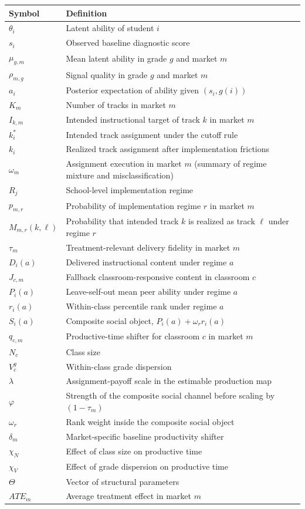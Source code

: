 \documentclass[11pt]{article}
\begin{document}
\begin{longtable}{p{2.5cm}p{11cm}}
\toprule
Symbol & Definition \\
\midrule
$\theta_i$ & Latent ability of student $i$ \\
$s_i$ & Observed baseline diagnostic score \\
$\mu_{g,m}$ & Mean latent ability in grade $g$ and market $m$ \\
$\rho_{m,g}$ & Signal quality in grade $g$ and market $m$ \\
$a_i$ & Posterior expectation of ability given $(s_i,g(i))$ \\
$K_m$ & Number of tracks in market $m$ \\
$I_{k,m}$ & Intended instructional target of track $k$ in market $m$ \\
$k_i^*$ & Intended track assignment under the cutoff rule \\
$k_i$ & Realized track assignment after implementation frictions \\
$\omega_m$ & Assignment execution in market $m$ (summary of regime mixture and misclassification) \\
$R_j$ & School-level implementation regime \\
$p_{m,r}$ & Probability of implementation regime $r$ in market $m$ \\
$M_{m,r}(k,\ell)$ & Probability that intended track $k$ is realized as track $\ell$ under regime $r$ \\
$\tau_m$ & Treatment-relevant delivery fidelity in market $m$ \\
$D_i(a)$ & Delivered instructional content under regime $a$ \\
$J_{c,m}$ & Fallback classroom-responsive content in classroom $c$ \\
$P_i(a)$ & Leave-self-out mean peer ability under regime $a$ \\
$r_i(a)$ & Within-class percentile rank under regime $a$ \\
$S_i(a)$ & Composite social object, $P_i(a)+\omega_r r_i(a)$ \\
$q_{c,m}$ & Productive-time shifter for classroom $c$ in market $m$ \\
$N_c$ & Class size \\
$V_c^g$ & Within-class grade dispersion \\
$\lambda$ & Assignment-payoff scale in the estimable production map \\
$\varphi$ & Strength of the composite social channel before scaling by $(1-\tau_m)$ \\
$\omega_r$ & Rank weight inside the composite social object \\
$\delta_m$ & Market-specific baseline productivity shifter \\
$\chi_N$ & Effect of class size on productive time \\
$\chi_V$ & Effect of grade dispersion on productive time \\
$\Theta$ & Vector of structural parameters \\
$ATE_m$ & Average treatment effect in market $m$ \\
\bottomrule
\end{longtable}
\end{document}
